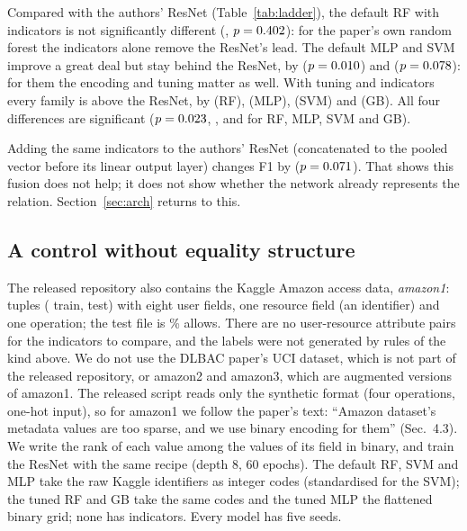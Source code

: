 \documentclass[11pt,a4paper]{article}
\begin{document}
Compared with the authors' ResNet (Table~\ref{tab:ladder}), the default RF with indicators is not significantly different (\dRfTheirsEq{}, $p=0.402$): for the paper's own random forest the indicators alone remove the ResNet's lead. The default MLP and SVM improve a great deal but stay behind the ResNet, by \dMlpRawTheirsEqU{} ($p=0.010$) and \dSvmTheirsEqU{} ($p=0.078$): for them the encoding and tuning matter as well. With tuning and indicators every family is above the ResNet, by \dRfTunedEqU{} (RF), \dMlpTunedEqU{} (MLP), \dSvmTunedEqU{} (SVM) and \dGbTunedEqU{} (GB). All four differences are significant ($p=0.023$, \pMlpTunedEq, \pSvmTunedEq{} and \pGbTunedEq{} for RF, MLP, SVM and GB).

\begin{table}[t]
\centering\footnotesize

\caption{F1 (mean over eight datasets) of each family in the default and in the tuned configuration, with and without the 64 equality indicators. GB has no default configuration in the original paper.}
\label{tab:gain}
\end{table}

Adding the same indicators to the authors' ResNet (concatenated to the pooled vector before its linear output layer) changes F1 by \vIndicatorsOnResnet{} ($p=0.071$). That shows this fusion does not help; it does not show whether the network already represents the relation. Section~\ref{sec:arch} returns to this.

\subsection{A control without equality structure}\label{sec:control}
The released repository also contains the Kaggle Amazon access data, \emph{amazon1}: \nAmazonTuples{} tuples (\nAmazonTrain{} train, \nAmazonTest{} test) with eight user fields, one resource field (an identifier) and one operation; the test file is \amPosRate\% allows. There are no user-resource attribute pairs for the indicators to compare, and the labels were not generated by rules of the kind above. We do not use the DLBAC paper's UCI dataset, which is not part of the released repository, or amazon2 and amazon3, which are augmented versions of amazon1. The released script reads only the synthetic format (four operations, one-hot input), so for amazon1 we follow the paper's text: ``Amazon dataset's metadata values are too sparse, and we use binary encoding for them'' (Sec.~4.3). We write the rank of each value among the values of its field in binary, and train the ResNet with the same recipe (depth 8, 60 epochs). The default RF, SVM and MLP take the raw Kaggle identifiers as integer codes (standardised for the SVM); the tuned RF and GB take the same codes and the tuned MLP the flattened binary grid; none has indicators. Every model has five seeds.
\end{document}

